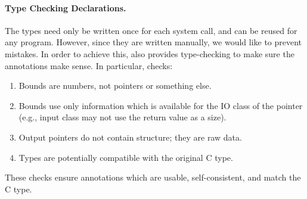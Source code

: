 \paragraph{Type Checking \tachyon Declarations.}

The \tachyon types need only be written once for each system call,
and can be reused for any program.  However, since they are written
manually, we would like to prevent mistakes.  In order to achieve
this, \tachyon also provides type-checking to make sure the
annotations make sense. In particular, \tachyon checks:
\begin{enumerate}
\item Bounds are numbers, not pointers or something else.
\item Bounds use only information which is available for the IO class of the pointer (e.g., input class may not use the return value as a size).
\item Output pointers do not contain structure; they are raw data.
\item Types are potentially compatible with the original C type.
\end{enumerate}
These checks ensure annotations which are usable, self-consistent, and match
the C type. 


